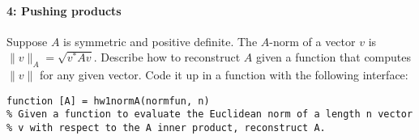 \documentclass[12pt, leqno]{article}
\begin{document}
\paragraph*{4: Pushing products}
Suppose $A$ is symmetric and positive definite.  The $A$-norm of a
vector $v$ is $\|v\|_A = \sqrt{v^* A v}$.  Describe how to reconstruct
$A$ given a function that computes $\|v\|$ for any given vector.
Code it up in a function with the following interface:
\begin{lstlisting}
function [A] = hw1normA(normfun, n)
% Given a function to evaluate the Euclidean norm of a length n vector
% v with respect to the A inner product, reconstruct A.
\end{lstlisting}
\end{document}
